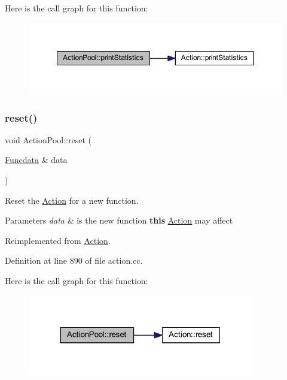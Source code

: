 Here is the call graph for this function\+:
\nopagebreak
\begin{figure}[H]
\begin{center}
\leavevmode
\includegraphics[width=350pt]{class_action_pool_aed2073462c2dc9a3c33a6720f9cfc93b_cgraph}
\end{center}
\end{figure}
\mbox{\label{class_action_pool_a63d93ad40b2066b0ad88fc83ee50c8e6}} 
\subsubsection{\texorpdfstring{reset()}{reset()}}
{\footnotesize\ttfamily void Action\+Pool\+::reset (\begin{DoxyParamCaption}\item[{\mbox{\hyperlink{class_funcdata}{Funcdata}} \&}]{data }\end{DoxyParamCaption})\hspace{0.3cm}{\ttfamily [virtual]}}



Reset the \mbox{\hyperlink{class_action}{Action}} for a new function. 


\begin{DoxyParams}{Parameters}
{\em data} & is the new function {\bfseries{this}} \mbox{\hyperlink{class_action}{Action}} may affect \\
\hline
\end{DoxyParams}


Reimplemented from \mbox{\hyperlink{class_action_ac7c1cf16bb63e0741ba16be5179cf943}{Action}}.



Definition at line 890 of file action.\+cc.

Here is the call graph for this function\+:
\nopagebreak
\begin{figure}[H]
\begin{center}
\leavevmode
\includegraphics[width=280pt]{class_action_pool_a63d93ad40b2066b0ad88fc83ee50c8e6_cgraph}
\end{center}
\end{figure}
\mbox{\label{class_action_pool_aef3e6dfc90703230f5f4e3fcdc626984}} 
